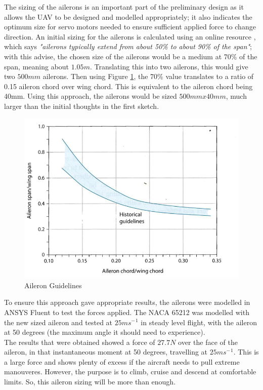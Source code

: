 \documentclass[12pt]{article}
\begin{document}
\noindent The sizing of the ailerons is an important part of the preliminary design as it allows the UAV to be designed and modelled appropriately; it also indicates the optimum size for servo motors needed to ensure sufficient applied force to change direction. An initial sizing for the ailerons is calculated using an online resource \cite{AILERONREF}, which says \emph{"ailerons typically extend from about 50\% to about 90\% of the span"}; with this advise, the chosen size of the ailerons would be a medium at 70\% of the span, meaning about $1.05m$. Translating this into two ailerons, this would give two $500mm$ ailerons. Then using Figure \ref{fig:aileron}, the 70\% value translates to a ratio of 0.15 aileron chord over wing chord. This is equivalent to the aileron chord being 40mm. Using this approach, the ailerons would be sized $500mm x 40mm$, much larger than the initial thoughts in the first sketch.

\begin{figure}[H]
\includegraphics[width=13cm, scale=1]{aileron.png}
\caption{Aileron Guidelines \cite{AILERONREF}}
\label{fig:aileron}
\end{figure}

\noindent To ensure this approach gave appropriate results, the ailerons were modelled in ANSYS Fluent to test the forces applied. The NACA 65212 was modelled with the new sized aileron and tested at $25ms{{^-}^1}$ in steady level flight, with the aileron at 50 degrees (the maximum angle it should need to experience). \\

\noindent The results that were obtained showed a force of $27.7N$ over the face of the aileron, in that instantaneous moment at 50 degrees, travelling at $25ms{{^-}^1}$. This is a large force and shows plenty of excess if the aircraft needs to pull extreme manouveres. However, the purpose is to climb, cruise and descend at comfortable limits. So, this aileron sizing will be more than enough. 
\end{document}
